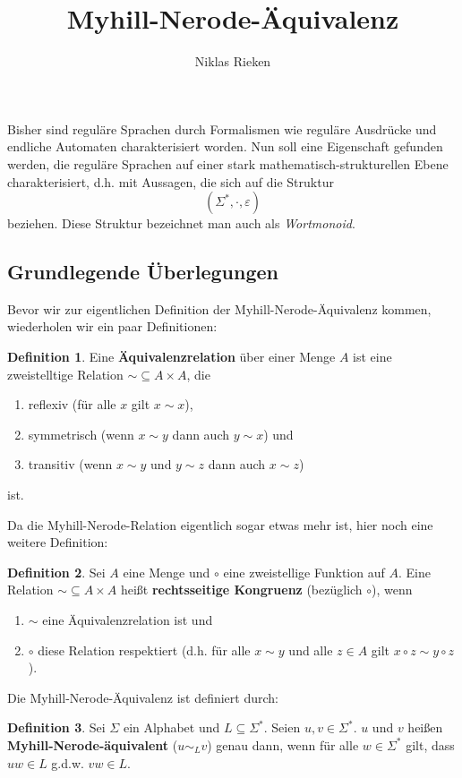 \documentclass[11pt, a4paper]{article}
\author{Niklas Rieken}
\title{Myhill-Nerode-Äquivalenz}
\theoremstyle{definition}
\newtheorem{definition}{Definition}
\theoremstyle{plain}
\begin{document}
\maketitle

Bisher sind reguläre Sprachen durch Formalismen wie reguläre Ausdrücke und endliche Automaten charakterisiert worden. Nun soll eine Eigenschaft gefunden werden, die reguläre Sprachen auf einer stark mathematisch-strukturellen Ebene charakterisiert, d.h. mit Aussagen, die sich auf die Struktur
\[
	(\Sigma^\ast, \cdot, \varepsilon)
\]
beziehen. Diese Struktur bezeichnet man auch als \textit{Wortmonoid}.

\subsection*{Grundlegende Überlegungen}
Bevor wir zur eigentlichen Definition der Myhill-Nerode-Äquivalenz kommen, wiederholen wir ein paar Definitionen:
\begin{definition}
	Eine \textbf{Äquivalenzrelation} über einer Menge \( A \) ist eine zweistelltige Relation \( \sim \subseteq A \times A \), die 
	\begin{enumerate}
		\item reflexiv (für alle \( x \) gilt \( x \sim x \)),
		\item symmetrisch (wenn \( x \sim y \) dann auch \( y \sim  x \)) und
		\item transitiv (wenn \( x \sim y \) und \( y \sim z \) dann auch \( x \sim z \)) 
	\end{enumerate}
	ist.
\end{definition}

Da die Myhill-Nerode-Relation eigentlich sogar etwas mehr ist, hier noch eine weitere Definition:
\begin{definition}
	Sei \( A \) eine Menge und \( \circ \) eine zweistellige Funktion auf \( A \). Eine Relation \( \sim \subseteq A \times A \) heißt \textbf{rechtsseitige Kongruenz} (bezüglich \( \circ \)), wenn
	\begin{enumerate}
		\item \( \sim \) eine Äquivalenzrelation ist und
		\item \( \circ \) diese Relation respektiert (d.h. für alle \( x \sim y \) und alle \( z \in A \) gilt \( x \circ z \sim y \circ z \)).
	\end{enumerate}
\end{definition}

Die Myhill-Nerode-Äquivalenz ist definiert durch:
\begin{definition}
	Sei \( \Sigma \) ein Alphabet und \( L \subseteq \Sigma^\ast \). Seien \( u, v \in \Sigma^\ast \). \( u \) und \( v \) heißen \textbf{Myhill-Nerode-äquivalent} (\( u \sim_L v \)) genau dann, wenn für alle \( w \in \Sigma^\ast \) gilt, dass \( uw \in L \) g.d.w. \( vw \in L \).
\end{definition}
\end{document}
